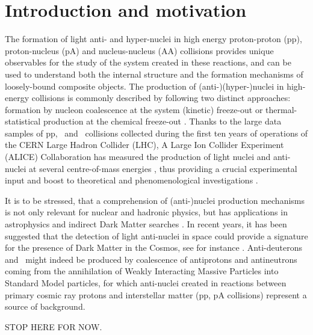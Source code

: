 \documentclass{appolb}
\begin{document}
\section{Introduction and motivation}
The formation of light anti- and hyper-nuclei in high energy proton-proton (pp), proton-nucleus (pA) and nucleus-nucleus (AA) collisions provides unique observables for the study of the system created in these reactions, and can be used to understand both the internal structure and the formation mechanisms of loosely-bound composite objects. 
The production of (anti-)(hyper-)nuclei in high-energy collisions is commonly described by following two distinct approaches: formation by nucleon coalescence at the system (kinetic) freeze-out \cite{Butler:1963, Kapusta:1980, Sato:1981ez, Nagle:1996vp, Scheibl:1998tk, Blum:2017qnn} or thermal-statistical production at the chemical freeze-out \cite{Andronic:2010qu,Andronic:2017}.
Thanks to the large data samples of pp, \pPb~and \PbPb~collisions collected during the first ten years of operations of the CERN Large Hadron Collider (LHC), A Large Ion Collider Experiment (ALICE) Collaboration 
has measured the production of light nuclei and anti-nuclei at several centre-of-mass energies \cite{ALICE:deuteronppPbPb2015, Adam:2015yta, anielski-HQ14, Puccio:2019oyd, ALICE:nucleipp2017, Acharya:2017dmc, Acharya:2019rgc}, thus providing a crucial experimental input and boost to theoretical and phenomenological investigations \cite{Mrowczynski:2016xqm, Bellini:2018epz, Bazak:2018hgl, Zhao:2018lyf, Sun:2018mqq, Xu:2018jff, Oliinychenko:2018ugs}.

It is to be stressed, that a comprehension of (anti-)nuclei production mechanisms is not only relevant for nuclear and hadronic physics, but has applications in astrophysics and indirect Dark Matter searches \cite{Aramaki:2015pii}. In recent years, it has been suggested that the detection of light anti-nuclei in space could provide a signature for the presence of Dark Matter in the Cosmos, see for instance \cite{Cirelli:2014qia, Korsmeier:2017xzj}. 
Anti-deuterons and \antihethree~might indeed be produced by coalescence of antiprotons and antineutrons coming from the annihilation of Weakly Interacting Massive Particles into Standard Model particles, for which anti-nuclei created in reactions between primary cosmic ray protons and interstellar matter (pp, pA collisions) represent a source of background.

STOP HERE FOR NOW.
\end{document}
